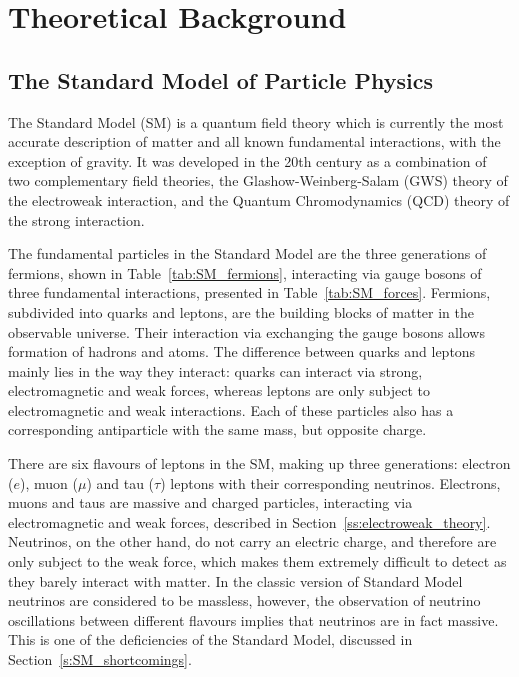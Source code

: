 
\chapter{Theoretical Background}
\label{c:theory}

\ifpdf
    \graphicspath{{02_Theory/plots/}}
\else
    \graphicspath{{02_Theory/plots/EPS/}{02_Theory/plots/}}
\fi

\section{The Standard Model of Particle Physics}
\label{s:SM}
The Standard Model (SM) is a quantum field theory which is currently the most accurate description of matter and all
known fundamental interactions, with the exception of gravity. It was developed in the 20th century as a combination of
two complementary field theories, the Glashow-Weinberg-Salam (GWS) \autocite{Glashow, Weinberg, Salam} theory of the
electroweak interaction, and the Quantum Chromodynamics (QCD) \autocite{Gell-Mann_1964, Gross_Wilczek, Politzer} theory
of the strong interaction.

The fundamental particles in the Standard Model are the three generations of fermions, shown in
Table~\ref{tab:SM_fermions}, interacting via gauge bosons of three fundamental interactions, presented in
Table~\ref{tab:SM_forces}. Fermions, subdivided into quarks and leptons, are the building blocks of matter in the
observable universe. Their interaction via exchanging the gauge bosons allows formation of hadrons and atoms. The
difference between quarks and leptons mainly lies in the way they interact: quarks can interact via strong,
electromagnetic and weak forces, whereas leptons are only subject to electromagnetic and weak interactions. Each of
these particles also has a corresponding antiparticle with the same mass, but opposite charge.

There are six flavours of leptons in the SM, making up three generations: electron ($e$), muon ($\mu$) and tau ($\tau$)
leptons with their corresponding neutrinos. Electrons, muons and taus are massive and charged particles, interacting via
electromagnetic and weak forces, described in Section~\ref{ss:electroweak_theory}. Neutrinos, on the other hand, do not
carry an electric charge, and therefore are only subject to the weak force, which makes them extremely difficult to
detect as they barely interact with matter. In the classic version of Standard Model neutrinos are considered to be
massless, however, the observation of neutrino oscillations between different flavours \autocite{neutrino_oscillations}
implies that neutrinos are in fact massive. This is one of the deficiencies of the Standard Model, discussed in
Section~\ref{s:SM_shortcomings}.

